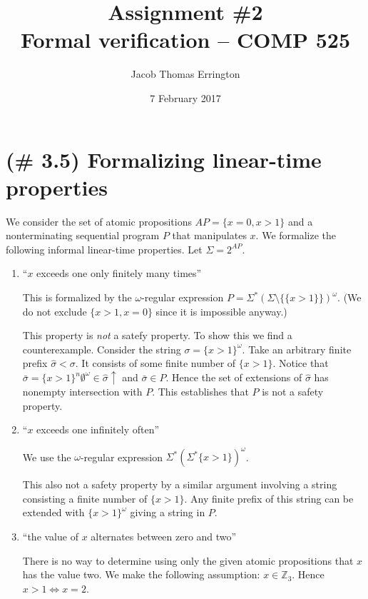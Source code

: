 \documentclass[letterpaper,11pt]{article}
\author{Jacob Thomas Errington}
\title{Assignment \#2\\Formal verification -- COMP 525}
\date{7 February 2017}
\newcommand{\Z}{\mathbb{Z}}
\newcommand{\up}{\uparrow}
\newcommand{\enumalpha}{\renewcommand\labelenumi{(\alph{enumi})}}
\begin{document}
\maketitle

\section{(\# 3.5) Formalizing linear-time properties}

We consider the set of atomic propositions $AP = \{x = 0, x > 1\}$ and a
nonterminating sequential program $P$ that manipulates $x$. We formalize the
following informal linear-time properties. Let $\Sigma = 2^{AP}$.

\begin{enumerate}
        \enumalpha \setcounter{enumi}{4}
    \item ``$x$ exceeds one only finitely many times''

        This is formalized by the $\omega$-regular expression
        $P = \Sigma^* (\Sigma \setminus \{ \{x>1\} \})^\omega$.
        (We do not exclude $\{x>1, x=0\}$ since it is impossible anyway.)

        This property is \emph{not} a satefy property. To show this we find a
        counterexample. Consider the string $\sigma = \{x > 1\}^\omega$. Take
        an arbitrary finite prefix $\hat \sigma < \sigma$. It consists of some
        finite number of $\{x > 1\}$. Notice that
        $\bar \sigma = \{x > 1\}^n \emptyset^\omega \in \hat \sigma \up$ and
        $\bar \sigma \in P$. Hence the set of extensions of $\hat \sigma$ has
        nonempty intersection with $P$. This establishes that $P$ is not a
        safety property.

    \item ``$x$ exceeds one infinitely often''

        We use the $\omega$-regular expression
        $\Sigma^* (\Sigma^* \{x>1\})^\omega$.

        This also not a safety property by a similar argument involving a
        string consisting a finite number of $\{x > 1\}$. Any finite prefix of
        this string can be extended with $\{x > 1\}^\omega$ giving a string in
        $P$.

    \item ``the value of $x$ alternates between zero and two''

        There is no way to determine using only the given atomic propositions
        that $x$ has the value two. We make the following assumption:
        $x \in \Z_3$. Hence $x > 1 \iff x = 2$.


\end{enumerate}
\end{document}
